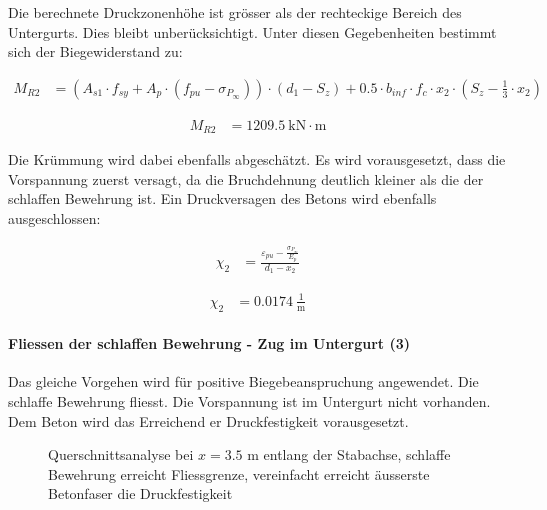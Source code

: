 \documentclass[
  11pt,
  letterpaper,
]{scrreprt}
\let\oldparagraph\paragraph
\renewcommand{\paragraph}[1]{\oldparagraph{#1}\mbox{}}
\begin{document}
Die berechnete Druckzonenhöhe ist grösser als der rechteckige Bereich
des Untergurts. Dies bleibt unberücksichtigt. Unter diesen Gegebenheiten
bestimmt sich der Biegewiderstand zu:

$$
\begin{aligned}
M_{R2} &= \left( A_{s1} \cdot f_{sy} + A_{p} \cdot \left( f_{pu} - \sigma_{P_{\infty}} \right) \right) \cdot \left( d_{1} - S_{z} \right) + 0.5 \cdot b_{inf} \cdot f_{c} \cdot x_{2} \cdot \left( S_{z} - \frac{ 1 }{ 3 } \cdot x_{2} \right) \; 
\end{aligned}
$$

$$
\begin{aligned}
M_{R2} &= 1209.5\ \mathrm{kN} \cdot \mathrm{m} \;
\end{aligned}
$$

Die Krümmung wird dabei ebenfalls abgeschätzt. Es wird vorausgesetzt,
dass die Vorspannung zuerst versagt, da die Bruchdehnung deutlich
kleiner als die der schlaffen Bewehrung ist. Ein Druckversagen des
Betons wird ebenfalls ausgeschlossen:

$$
\begin{aligned}
\chi_{2} &= \frac{ \varepsilon_{pu} - \frac{ \sigma_{P_{\infty}} }{ E_{p} } }{ d_{1} - x_{2} } \; 
\end{aligned}
$$

$$
\begin{aligned}
\chi_{2} &= 0.0174\ \frac{1}{\mathrm{m}} \;
\end{aligned}
$$

\paragraph{Fliessen der schlaffen Bewehrung - Zug im Untergurt
(3)}\label{fliessen-der-schlaffen-bewehrung---zug-im-untergurt-3}

Das gleiche Vorgehen wird für positive Biegebeanspruchung angewendet.
Die schlaffe Bewehrung fliesst. Die Vorspannung ist im Untergurt nicht
vorhanden. Dem Beton wird das Erreichend er Druckfestigkeit
vorausgesetzt.

\begin{figure}[H]


\caption{\label{fig-t6_qs_MR_neg}Querschnittsanalyse bei \(x=3.5\) m
entlang der Stabachse, schlaffe Bewehrung erreicht Fliessgrenze,
vereinfacht erreicht äusserste Betonfaser die Druckfestigkeit}

\end{figure}%
\end{document}
